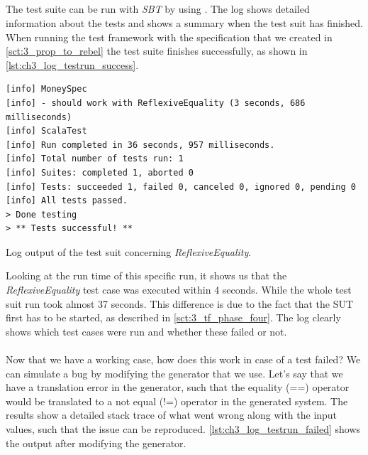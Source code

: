 \subsection{\tfPhaseFive{}}
The test suite can be run with \textit{SBT} by using . The log shows detailed information about the tests and shows a summary when the test suit has finished. When running the test framework with the specification that we created in \autoref{sct:3_prop_to_rebel} the test suite finishes successfully, as shown in \autoref{lst:ch3_log_testrun_success}.
\FloatBarrier
\begin{sourcecode}[!ht]
\begin{lstlisting}[language=Log]
[info] MoneySpec
[info] - should work with ReflexiveEquality (3 seconds, 686 milliseconds)
[info] ScalaTest
[info] Run completed in 36 seconds, 957 milliseconds.
[info] Total number of tests run: 1
[info] Suites: completed 1, aborted 0
[info] Tests: succeeded 1, failed 0, canceled 0, ignored 0, pending 0
[info] All tests passed.
> Done testing
> ** Tests successful! **
\end{lstlisting}
\caption{Log output of the test suit concerning \textit{ReflexiveEquality}.}
\label{lst:ch3_log_testrun_success}
\end{sourcecode}
\FloatBarrier
Looking at the run time of this specific run, it shows us that the \textit{ReflexiveEquality} test case was executed within 4 seconds. While the whole test suit run took almost 37 seconds. This difference is due to the fact that the SUT first has to be started, as described in \autoref{sct:3_tf_phase_four}. The log clearly shows which test cases were run and whether these failed or not.\\
\\
Now that we have a working case, how does this work in case of a test failed? We can simulate a bug by modifying the generator that we use. Let's say that we have a translation error in the generator, such that the equality (==) operator would be translated to a not equal (!=) operator in the generated system. The results show a detailed stack trace of what went wrong along with the input values, such that the issue can be reproduced. \autoref{lst:ch3_log_testrun_failed} shows the output after modifying the generator.
\FloatBarrier
